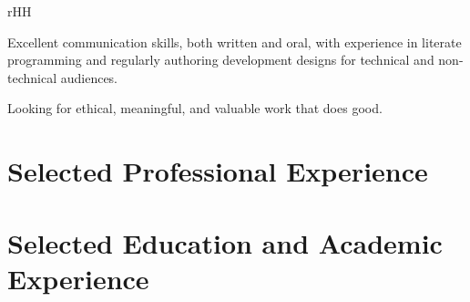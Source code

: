 \documentclass{simplecv}
\newif\ifgithub
\begin{document}
\begin{minipage}{\textwidth}
\begin{tabular}{rHH}
  \end{tabular}

  \smallskip

  Excellent communication skills, both written and oral, with
  experience in literate programming and regularly authoring
  development designs for technical and non-technical audiences.

  \medskip

  Looking for ethical, meaningful, and valuable work that does good.

\end{minipage}

\vfill
\section{Selected Professional Experience}


\section{Selected Education and Academic Experience}

\vfill \vfill
\newpage~
\ifgithub
\vfill
\section{Selected Open Source Contributions and Pro-Bono Work}

In addition to various contributions to other projects (ranging from
simple typos to small\slash substantial fixes and enhancements), I
also maintain many projects of my own on GitHub
(\censor{\href{http://www.github.com/vermiculus}{\texttt{@vermiculus}}}).
I find great enjoyment in enhancing developer toolsets and workflows.

\inputproject{magithub}
\inputproject{api-wrap}
\inputproject{emake}
\inputproject{sx.el}
\inputproject{ssa-tool}
\inputproject{snael}
\inputproject{auctex-lua}
\inputproject{butterseal}
\inputproject{lda-smc}

\fi
\vfill
\end{document}
